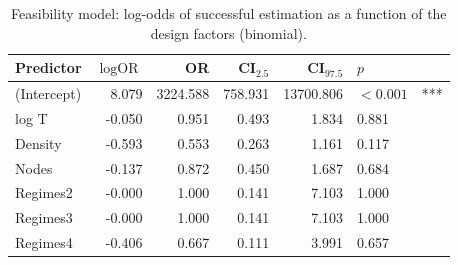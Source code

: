 \begin{table}[ht]
\centering
\begin{tabular}{lrrrrll}
  \hline
Predictor & $\log\text{OR}$ & OR & CI$_{2.5}$ & CI$_{97.5}$ & $p$ &  \\ 
  \hline
(Intercept) & 8.079 & 3224.588 & 758.931 & 13700.806 & $<0.001$ & *** \\ 
  log T & -0.050 & 0.951 & 0.493 & 1.834 & 0.881 &  \\ 
  Density & -0.593 & 0.553 & 0.263 & 1.161 & 0.117 &  \\ 
  Nodes & -0.137 & 0.872 & 0.450 & 1.687 & 0.684 &  \\ 
  Regimes2 & -0.000 & 1.000 & 0.141 & 7.103 & 1.000 &  \\ 
  Regimes3 & -0.000 & 1.000 & 0.141 & 7.103 & 1.000 &  \\ 
  Regimes4 & -0.406 & 0.667 & 0.111 & 3.991 & 0.657 &  \\ 
   \hline
\end{tabular}
\caption{Feasibility model: log-odds of successful estimation as a function of the design factors (binomial).} 
\end{table}
